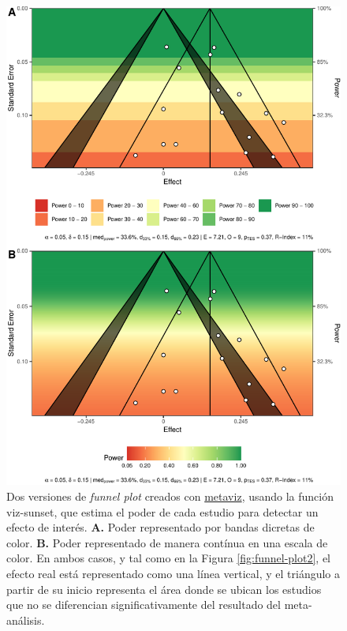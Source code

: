 \documentclass[
  bookmarksnumbered]{article}
\begin{document}
\begin{figure}
\centering
\includegraphics{Meta-analysis_files/figure-latex/funnel-plot3-1.pdf}
\caption{\label{fig:funnel-plot3}Dos versiones de \emph{funnel plot} creados con \href{https://cran.r-project.org/web/packages/metaviz/vignettes/metaviz.html}{metaviz}, usando la función viz-sunset, que estima el poder de cada estudio para detectar un efecto de interés. \textbf{A.} Poder representado por bandas dicretas de color. \textbf{B.} Poder representado de manera contínua en una escala de color. En ambos casos, y tal como en la Figura \ref{fig:funnel-plot2}, el efecto real está representado como una línea vertical, y el triángulo a partir de su inicio representa el área donde se ubican los estudios que no se diferencian significativamente del resultado del meta-análisis.}
\end{figure}
\end{document}
